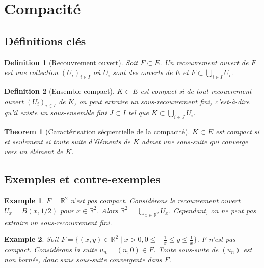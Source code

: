 \documentclass{article}
\newtheorem{theorem}{Theorem}
\newtheorem{definition}{Definition}
\newtheorem{example}{Example}
\begin{document}
\sloppy

\section{Compacité}

\subsection{Définitions clés}

\begin{definition}[Recouvrement ouvert]
Soit $F \subset E$. Un recouvrement ouvert de $F$ est une collection $(U_i)_{i \in I}$ où $U_i$ sont des ouverts de $E$ et $F \subset \bigcup_{i \in I} U_i$.
\end{definition}

\begin{definition}[Ensemble compact]
$K \subset E$ est compact si de tout recouvrement ouvert $(U_i)_{i \in I}$ de $K$, on peut extraire un sous-recouvrement fini, c'est-à-dire qu'il existe un sous-ensemble fini $J \subset I$ tel que $K \subset \bigcup_{i \in J} U_i$.
\end{definition}

\begin{theorem}[Caractérisation séquentielle de la compacité]
$K \subset E$ est compact si et seulement si toute suite d'éléments de $K$ admet une sous-suite qui converge vers un élément de $K$.
\end{theorem}

\subsection{Exemples et contre-exemples}

\begin{example}
$F = \mathbb{R}^2$ n'est pas compact. Considérons le recouvrement ouvert $U_x = B(x, 1/2)$ pour $x \in \mathbb{R}^2$. Alors $\mathbb{R}^2 = \bigcup_{x \in \mathbb{R}^2} U_x$. Cependant, on ne peut pas extraire un sous-recouvrement fini.
\end{example}

\begin{example}
Soit $F = \{(x, y) \in \mathbb{R}^2 \mid x > 0, 0 \leq -\frac{1}{x} \leq y \leq \frac{1}{x} \}$. $F$ n'est pas compact. Considérons la suite $u_n = (n, 0) \in F$. Toute sous-suite de $(u_n)$ est non bornée, donc sans sous-suite convergente dans $F$.
\end{example}
\end{document}
